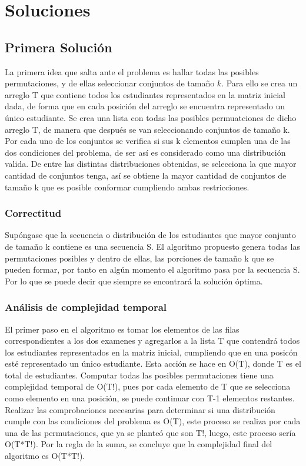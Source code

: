 \documentclass{article}
\begin{document}
\section{Soluciones}

\subsection{Primera Solución}

La primera idea que salta ante el problema es hallar todas las posibles permutaciones, y de ellas seleccionar conjuntos de tamaño $k$. Para ello se crea un arreglo T que contiene todos los estudiantes representados en la matriz inicial dada, de forma que en cada posición del arreglo se encuentra representado un único estudiante. Se crea una lista con todas las posibles permuatciones de dicho arreglo T, de manera que después se van seleccionando conjuntos de tamaño k. Por cada uno de los conjuntos se verifica si sus k elementos cumplen una de las dos condiciones del problema, de ser así es considerado como una distribución valida. De entre las distintas distribuciones obtenidas, se selecciona la que mayor cantidad de conjuntos tenga, así se obtiene la mayor cantidad de conjuntos de tamaño k que es posible conformar cumpliendo ambas restricciones.

\subsubsection{Correctitud}

Supóngase que la secuencia o distribución de los estudiantes que mayor conjunto de tamaño k contiene es una secuencia S. El algoritmo propuesto genera todas las permutaciones posibles y dentro de ellas, las porciones de tamaño k que se pueden formar, por tanto en algún momento el algoritmo pasa por la secuencia S. Por lo que se puede decir que siempre se encontrará la solución óptima.

\subsubsection{Análisis de complejidad temporal}

El primer paso en el algoritmo es tomar los elementos de las filas correspondientes a los dos examenes y agregarlos a la lista T que contendrá todos los estudiantes representados en la matriz inicial, cumpliendo que en una posicón esté representado un único estudiante. Esta acción se hace en O(T), donde T es el total de estudiantes. Computar todas las posibles permutaciones tiene una complejidad temporal de O(T!), pues por cada elemento de T que se selecciona como elemento en una posición, se puede continuar con T-1 elementos restantes. Realizar las comprobaciones necesarias para determinar si una distribución cumple con las condiciones del problema es O(T), este proceso se realiza por cada una de las permutaciones, que ya se planteó que son T!, luego, este proceso sería O(T*T!). Por la regla de la suma, se concluye que la complejidad final del algoritmo es O(T*T!).
\end{document}
